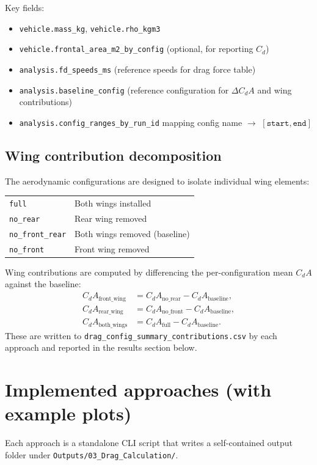 \documentclass[11pt,a4paper]{article}
\begin{document}
Key fields:
\begin{itemize}
  \item \texttt{vehicle.mass\_kg}, \texttt{vehicle.rho\_kgm3}
  \item \texttt{vehicle.frontal\_area\_m2\_by\_config} (optional, for reporting \(C_d\))
  \item \texttt{analysis.fd\_speeds\_ms} (reference speeds for drag force table)
  \item \texttt{analysis.baseline\_config} (reference configuration for \(\Delta C_dA\) and wing contributions)
  \item \texttt{analysis.config\_ranges\_by\_run\_id} mapping config name $\rightarrow$ \([\texttt{start},\texttt{end}]\)
\end{itemize}

\subsection*{Wing contribution decomposition}
The aerodynamic configurations are designed to isolate individual wing elements:
\begin{center}
\begin{tabular}{ll}
\texttt{full}           & Both wings installed \\
\texttt{no\_rear}       & Rear wing removed \\
\texttt{no\_front\_rear} & Both wings removed (baseline) \\
\texttt{no\_front}      & Front wing removed \\
\end{tabular}
\end{center}

Wing contributions are computed by differencing the per-configuration mean
$C_dA$ against the baseline:
\begin{align*}
  C_dA_\text{front\_wing} &= C_dA_\text{no\_rear} - C_dA_\text{baseline}, \\
  C_dA_\text{rear\_wing}  &= C_dA_\text{no\_front} - C_dA_\text{baseline}, \\
  C_dA_\text{both\_wings} &= C_dA_\text{full} - C_dA_\text{baseline}.
\end{align*}
These are written to \texttt{drag\_config\_summary\_contributions.csv} by each
approach and reported in the results section below.

\section{Implemented approaches (with example plots)}
Each approach is a standalone CLI script that writes a self-contained output
folder under \texttt{Outputs/03\_Drag\_Calculation/}.
\end{document}
